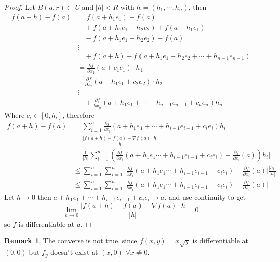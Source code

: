 \documentclass[11pt,a4paper]{article}
\theoremstyle{definition}
\newtheorem{remark}[definition]{Remark}
\theoremstyle{plain}
\theoremstyle{remark}
\newcommand{\abs}[1]{\lvert #1 \rvert}
\begin{document}
\begin{proof}
    Let $B(a,r) \subset U$ and $|h| < R$ with $h = (h_1, \cdots, h_n)$, then 
    \begin{align*}
        f(a+h) - f(a) &= f(a + h_1 e_1) - f(a) \\
        &\quad + f(a + h_1 e_1 + h_2 e_2) + f(a + h_1 e_1) \\
        &\quad - f(a + h_1 e_1 + h_2 e_2) - f(a) \\
        &\vdots\\
        &\quad + f(a + h) - f(a + h_1 e_1 + h_2 e_2 + \cdots + h_{n-1} e_{n-1}) \\
        &= \frac{\partial f}{\partial x_1} (a + c_1 e_1) \cdot h_1 \\
        &\quad \frac{\partial f}{\partial x_2} (a + h_1 e_1 + c_2 e_2) \cdot h_2 \\
        &\vdots \\
        &\quad + \frac{\partial f}{\partial x_n} (a + h_1 e_1 + \cdots + h_{n-1} e_{n-1} + c_n e_n) h_n
    \end{align*}    
    Where $c_i \in [0, h_i]$, therefore 
    \begin{align*}
        f(a+ h) - f(a) &= \sum_{i=1}^n \frac{\partial f}{\partial x_i} (a + h_1 e_1 + \cdots + h_{i-1} e_{i-1} + c_i e_i) h_i \\
        &= \frac{|f(a + h) - f(a) - \nabla f(a) \cdot h|}{h} \\
        &= \frac{1}{|h|} \sum_{i=1}^n \left(\frac{\partial f}{\partial x_i} (a + h_1 e_1 \cdots + h_{i-1} e_{i-1} + c_i e_i) - \frac{\partial f}{\partial x_i} (a)\right) h_i| \\
        &\le \sum_{i=1}^n \sum_{i=1}^n \abs{\frac{\partial f}{\partial x_i}  (a + h_1 e_1 \cdots + h_{i-1} e_{i-1} + c_i e_i) - \frac{\partial f}{\partial x_i} (a)} \frac{|h_i|}{|h|} \\
        &\le \sum_{i=1}^n \sum_{i=1}^n \abs{\frac{\partial f}{\partial x_i}  (a + h_1 e_1 \cdots + h_{i-1} e_{i-1} + c_i e_i) - \frac{\partial f}{\partial x_i} (a)} 
    \end{align*}
    Let $h \to 0$ then $a + h_1 e_1 + \cdots + h_{i-1} e_{i-1} + c_i e_i \to a$. 
    and use continuity to get 
    $$\lim_{h \to 0} \frac{|f(a+h) - f(a) - \nabla f(a) \cdot h}{|h|} = 0$$
    so $f$ is differentiable at $a$.
\end{proof}

\begin{remark}
    The converse is not true, since $f(x,y) = x \sqrt{y}$ is differentiable at $(0,0)$ but $f_y$ doesn't exist at $(x,0)$ $\forall x \ne 0$. 
\end{remark}
\end{document}
